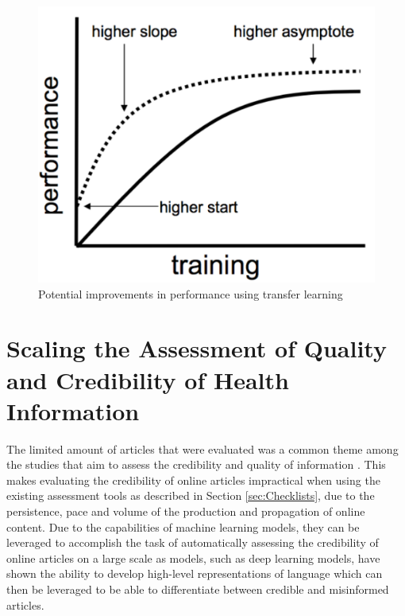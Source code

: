 \documentclass[a4paper,twoside,phd]{BYUPhys}
\begin{document}
\begin{figure}[H]
	\centering
	\includegraphics[totalheight=7cm]{images/transfer-learning.png}
	\caption{Potential improvements in performance using transfer learning \cite{Browniee2017}}
	\label{fig:TransferLearning}
\end{figure}


\section{Scaling the Assessment of Quality and Credibility of Health Information}
\label{sec:ScalingAssessment}

The limited amount of articles that were evaluated was a common theme among the studies that aim to assess the credibility and quality of information \cite{Batchelor2009} \cite{CanteyBanasiak2017} \cite{Cipriani} \cite{Kaicker2010} \cite{Som2012}.
This makes evaluating the credibility of online articles impractical when using the existing assessment tools as described in Section \ref{sec:Checklists}, due to the persistence, pace and volume of the production and propagation of online content. Due to the capabilities of machine learning models, they can be leveraged to accomplish the task of automatically assessing the credibility of online articles on a large scale as models, such as deep learning models, have shown the ability to develop high-level representations of language which can then be leveraged to be able to differentiate between credible and misinformed articles.
\end{document}
